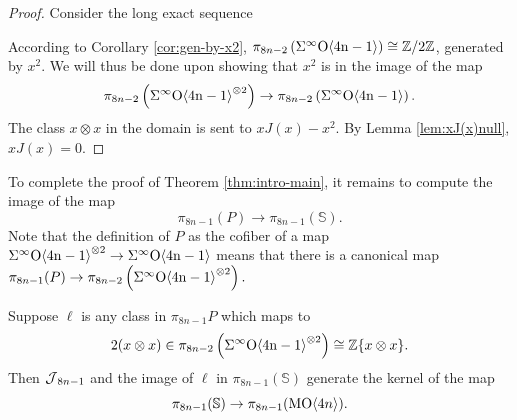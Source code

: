 \begin{proof}
Consider the long exact sequence
\begin{center}
\end{center}
According to Corollary \ref{cor:gen-by-x2}, $\pi_{8n-2} \left( \Sigma^{\infty} \mathrm{O \langle 4n-1\rangle} \right) \cong \mathbb{Z}/2\mathbb{Z}$, generated by $x^2$.
We will thus be done upon showing that $x^2$ is in the image of the map
$$\pi_{8n-2} \left( \Sigma^{\infty} \mathrm{O \langle 4n-1\rangle}^{\otimes 2} \right) \to \pi_{8n-2} \left( \Sigma^{\infty} \mathrm{O \langle 4n-1\rangle} \right).$$
The class $x \otimes x$ in the domain is sent to $xJ(x)-x^2$.  By Lemma \ref{lem:xJ(x)null}, $xJ(x)=0$.
\end{proof}

To complete the proof of Theorem \ref{thm:intro-main}, it remains to compute the image of the map
$$\pi_{8n-1} (P) \to \pi_{8n-1} (\mathbb{S}).$$
Note that the definition of $P$ as the cofiber of a map $\Sigma^{\infty} \mathrm{O \langle 4n-1\rangle}^{\otimes 2} \to \Sigma^{\infty} \mathrm{O \langle 4n-1\rangle}$ means that there is a canonical map
$\pi_{8n-1} (P) \to \pi_{8n-2} \left( \Sigma^{\infty} \mathrm{O \langle 4n-1\rangle}^{\otimes 2} \right).$

\begin{lem} \label{lem:Reduction1}
Suppose $\ell$ is any class in $\pi_{8n-1} P$ which maps to 
$$2(x \otimes x) \in \pi_{8n-2} \left( \Sigma^{\infty} \mathrm{O \langle 4n-1\rangle}^{\otimes 2} \right) \cong \mathbb{Z}\{x \otimes x\}.$$
Then $\operatorname{\mathcal{J}}_{8n-1}$ and the image of $\ell$ in $\pi_{8n-1} (\mathbb{S})$ generate the kernel of the map
$$\pi_{8n-1} (\mathbb{S}) \to \pi_{8n-1} (\operatorname{\mathrm{MO}} \langle 4n \rangle).$$
\end{lem}

